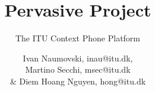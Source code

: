 \documentclass{scrartcl}
\begin{document}
\title{Pervasive Project}
\subtitle{The ITU Context Phone Platform}
\author{Ivan Naumovski, inau@itu.dk,\\ Martino Secchi, msec@itu.dk\\ \& Diem Hoang Nguyen, hong@itu.dk}

\maketitle
\tableofcontents


\end{document}
